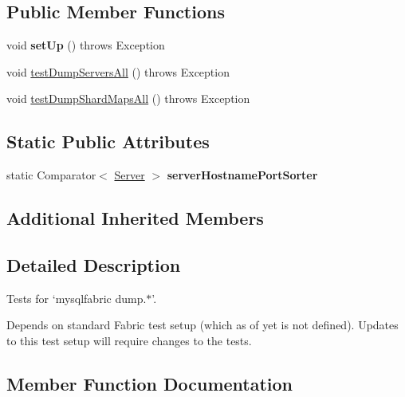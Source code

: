 \subsection*{Public Member Functions}
\begin{DoxyCompactItemize}
\item 
\mbox{\label{classtestsuite_1_1fabric_1_1_test_dump_commands_ac7c8f24d87fb9e1bb0c5f612e65b5340}} 
void {\bfseries set\+Up} ()  throws Exception 
\item 
void \mbox{\hyperlink{classtestsuite_1_1fabric_1_1_test_dump_commands_a75941414b59513c00c54c4fc8f09f13e}{test\+Dump\+Servers\+All}} ()  throws Exception 
\item 
void \mbox{\hyperlink{classtestsuite_1_1fabric_1_1_test_dump_commands_a4badae860db743cca162a2b34ea98675}{test\+Dump\+Shard\+Maps\+All}} ()  throws Exception 
\end{DoxyCompactItemize}
\subsection*{Static Public Attributes}
\begin{DoxyCompactItemize}
\item 
static Comparator$<$ \mbox{\hyperlink{classcom_1_1mysql_1_1fabric_1_1_server}{Server}} $>$ {\bfseries server\+Hostname\+Port\+Sorter}
\end{DoxyCompactItemize}
\subsection*{Additional Inherited Members}


\subsection{Detailed Description}
Tests for `mysqlfabric dump.$\ast$'.

Depends on standard Fabric test setup (which as of yet is not defined). Updates to this test setup will require changes to the tests. 

\subsection{Member Function Documentation}
\mbox{\label{classtestsuite_1_1fabric_1_1_test_dump_commands_a75941414b59513c00c54c4fc8f09f13e}} 
